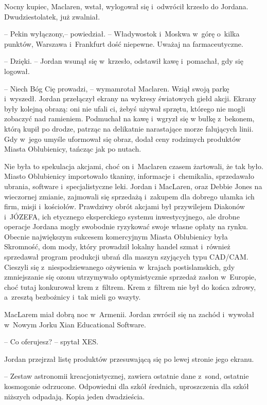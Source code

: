 \documentclass[oneside,polish,11pt,sfheadings]{mwbk}
\begin{document}
Nocny kupiec, Maclaren, wstał, wylogował się i~odwrócił krzesło do
Jordana. Dwudziestolatek, już zwalniał.

-- Pekin wyłączony,-- powiedział. -- Władywostok i~Moskwa w~górę o~kilka
punktów, Warszawa i~Frankfurt dość niepewne. Uważaj na farmaceutyczne.

-- Dzięki. -- Jordan wsunął się w~krzesło, odstawił kawę i~pomachał, gdy
się logował.

-- Niech Bóg Cię prowadzi, -- wymamrotał Maclaren. Wziął swoją parkę i~wyszedł. Jordan przełączył ekrany na wykresy światowych giełd akcji.
Ekrany były kolejną obrazą: oni nie ufali ci, żebyś używał sprzętu,
którego nie mogli zobaczyć nad ramieniem. Podmuchał na kawę i~wgryzł się
w bułkę z~bekonem, którą kupił po drodze, patrząc na delikatnie
narastające morze falujących linii. Gdy w~jego umyśle uformował się
obraz, dodał ceny rodzimych produktów Miasta Oblubienicy, tańcząc jak po
nutach.

Nie była to spekulacja akcjami, choć on i~Maclaren czasem żartowali, że
tak było. Miasto Oblubienicy importowało tkaniny, informacje i~chemikalia, sprzedawało ubrania, software i~specjalistyczne leki. Jordan
i MacLaren, oraz Debbie Jones na wieczornej zmianie, zajmowali się
sprzedażą i~zakupem dla dobrego ułamka ich firm, misji i~kościołów.
Prawdziwy obrót akcjami był przywilejem Diakonów i~JÓZEFA, ich etycznego
eksperckiego systemu inwestycyjnego, ale drobne operacje Jordana mogły
swobodnie ryzykować swoje własne opłaty na rynku. Obecnie największym
sukcesem komercyjnym Miasta Oblubienicy była Skromność, dom mody, który
prowadził lokalny handel szmat i~również sprzedawał program produkcji
ubrań dla maszyn szyjących typu CAD/CAM. Cieszyli się z~niespodziewanego
ożywienia w~krajach postislamskich, gdy zmniejszanie się ozonu
utrzymywało optymistycznie sprzedaż zasłon w~Europie, choć tutaj
konkurował krem z~filtrem. Krem z~filtrem nie był do końca zdrowy, a~zresztą bezbożnicy i~tak mieli go wszyty.

MacLarem miał dobrą noc w~Armenii. Jordan zwrócił się na zachód i~wywołał w~Nowym Jorku Xian Educational Software.

-- Co oferujesz? -- spytał XES.

Jordan przejrzał listę produktów przesuwającą się po lewej stronie jego
ekranu.

-- Zestaw astronomii kreacjonistycznej, zawiera ostatnie dane z~sond,
ostatnie kosmogonie odrzucone. Odpowiedni dla szkół średnich,
uproszczenia dla szkół niższych odpadają. Kopia jeden dwadzieścia.
\end{document}
